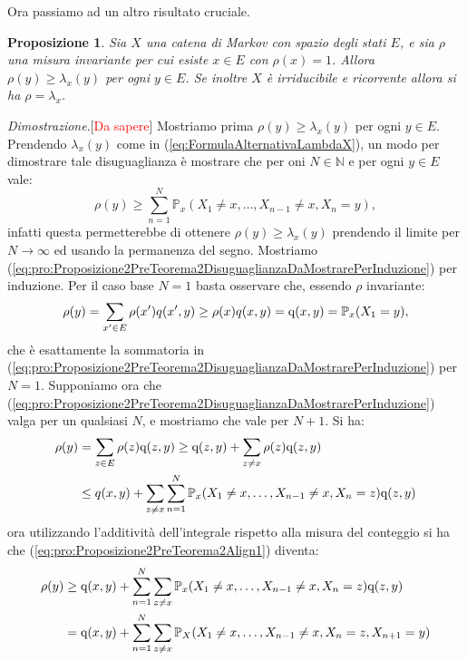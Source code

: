 \documentclass[11pt]{book}
\makeatletter
\theoremstyle{Definizione}
\theoremstyle{TeoremaProposizioneLemmaCorollario}
\newtheorem{mypropo}[myteo]{Proposizione}
\theoremstyle{OsservazioneNota}
\renewenvironment{proof}[1][\proofname]{\par
  \normalfont \topsep6\p@\@plus6\p@\relax
  \trivlist
  \item[\hskip\labelsep
        \itshape
    #1\@addpunct{.}]\ignorespaces
}{%
  \endtrivlist\@endpefalse
}
\newcommand{\N}{\mathbb{N}}
\renewcommand{\P}{\mathbb{P}}
\newcommand{\q}{\textup{q}}
\renewenvironment{proof}{\textsl{Dimostrazione}.}{}
\makeatother
\begin{document}
\noindent
Ora passiamo ad un altro risultato cruciale.
\begin{boxpro}
\begin{mypropo}\label{pro:Proposizione2PreTeorema2}
Sia $X$ una catena di Markov con spazio degli stati $E$, e sia $\rho$ una misura invariante per cui esiste $x\in E$ con $\rho(x) = 1$. Allora $\rho(y) \geq \lambda_x(y)$ per ogni $y\in E$. Se inoltre $X$ è irriducibile e ricorrente allora si ha $\rho = \lambda_x$.
\end{mypropo}
\tcblower
\begin{proof}[\textcolor{red}{Da sapere}]
Mostriamo prima $\rho(y) \geq \lambda_x(y)$ per ogni $y\in E$. Prendendo $\lambda_x(y)$ come in (\ref{eq:FormulaAlternativaLambdaX}), un modo per dimostrare tale disuguaglianza è mostrare che per oni $N \in \N$ e per ogni $y\in E$ vale:
\begin{equation}\label{eq:pro:Proposizione2PreTeorema2DisuguaglianzaDaMostrarePerInduzione}
\rho(y) \geq \sum_{n = 1}^N \P_x(X_1 \neq x,\dots,X_{n-1}\neq x, X_n = y),
\end{equation}
infatti questa permetterebbe di ottenere $\rho(y) \geq \lambda_x(y)$ prendendo il limite per $N \to \infty$ ed usando la permanenza del segno. Mostriamo (\ref{eq:pro:Proposizione2PreTeorema2DisuguaglianzaDaMostrarePerInduzione}) per induzione. Per il caso base $N = 1$ basta osservare che, essendo $\rho$ invariante:
$$
\rho(y) = \sum_{x'\in E} \rho(x')q(x',y) \geq \rho(x)q(x,y) = \q(x,y) = \P_x(X_1 = y),
$$
che è esattamente la sommatoria in (\ref{eq:pro:Proposizione2PreTeorema2DisuguaglianzaDaMostrarePerInduzione}) per $N = 1$. Supponiamo ora che (\ref{eq:pro:Proposizione2PreTeorema2DisuguaglianzaDaMostrarePerInduzione}) valga per un qualsiasi $N$, e mostriamo che vale per $N +1$. Si ha:
\begin{align}\label{eq:pro:Proposizione2PreTeorema2Align1}
\rho(y) &= \sum_{z \in E} \rho(z)\q(z,y) \geq \q(z,y) +\sum_{z \neq x} \rho(z)\q(z,y)\nonumber \\
&\leq q(x,y) + \sum_{z \neq x} \sum_{n = 1}^N \P_x(X_1\neq x, \dots, X_{n-1} \neq x, X_n = z) \q(z,y) 
\end{align}
ora utilizzando l'additività dell'integrale rispetto alla misura del conteggio si ha che (\ref{eq:pro:Proposizione2PreTeorema2Align1}) diventa:
\begin{align*}
\rho(y) &\geq \q(x,y)+ \sum_{n = 1}^N \sum_{z\neq x}\P_x(X_1 \neq x,\dots, X_{n-1}\neq x, X_n = z)\q(z,y)\\
&= \q(x,y) + \sum_{n = 1}^N \sum_{z \neq x}\P_X(X_1 \neq x,\dots, X_{n-1} \neq x, X_n = z, X_{n+1} = y)\\

\end{align*}
\end{proof}
\end{boxpro}
\end{document}
